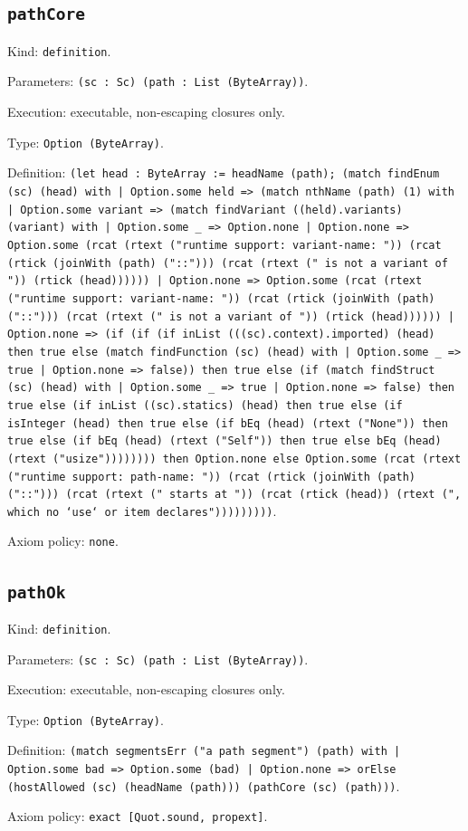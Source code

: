 \documentclass[11pt]{article}
\begin{document}
\subsection*{\texttt{pathCore}}
\noindent Kind: \texttt{definition}.\par
\noindent Parameters: \texttt{(sc : Sc) (path : List (ByteArray))}.\par
\noindent Execution: executable, non-escaping closures only.\par
\noindent Type: \texttt{Option (ByteArray)}.\par
\noindent Definition: \texttt{(let head : ByteArray := headName (path); (match findEnum (sc) (head) with | Option.some held => (match nthName (path) (1) with | Option.some variant => (match findVariant ((held).variants) (variant) with | Option.some \_ => Option.none | Option.none => Option.some (rcat (rtext ("runtime support: variant-name: ")) (rcat (rtick (joinWith (path) ("::"))) (rcat (rtext (" is not a variant of ")) (rtick (head)))))) | Option.none => Option.some (rcat (rtext ("runtime support: variant-name: ")) (rcat (rtick (joinWith (path) ("::"))) (rcat (rtext (" is not a variant of ")) (rtick (head)))))) | Option.none => (if (if (if inList (((sc).context).imported) (head) then true else (match findFunction (sc) (head) with | Option.some \_ => true | Option.none => false)) then true else (if (match findStruct (sc) (head) with | Option.some \_ => true | Option.none => false) then true else (if inList ((sc).statics) (head) then true else (if isInteger (head) then true else (if bEq (head) (rtext ("None")) then true else (if bEq (head) (rtext ("Self")) then true else bEq (head) (rtext ("usize")))))))) then Option.none else Option.some (rcat (rtext ("runtime support: path-name: ")) (rcat (rtick (joinWith (path) ("::"))) (rcat (rtext (" starts at ")) (rcat (rtick (head)) (rtext (", which no `use` or item declares")))))))))}.\par
\noindent Axiom policy: \texttt{none}.\par
\subsection*{\texttt{pathOk}}
\noindent Kind: \texttt{definition}.\par
\noindent Parameters: \texttt{(sc : Sc) (path : List (ByteArray))}.\par
\noindent Execution: executable, non-escaping closures only.\par
\noindent Type: \texttt{Option (ByteArray)}.\par
\noindent Definition: \texttt{(match segmentsErr ("a path segment") (path) with | Option.some bad => Option.some (bad) | Option.none => orElse (hostAllowed (sc) (headName (path))) (pathCore (sc) (path)))}.\par
\noindent Axiom policy: \texttt{exact [Quot.sound, propext]}.\par
\end{document}
